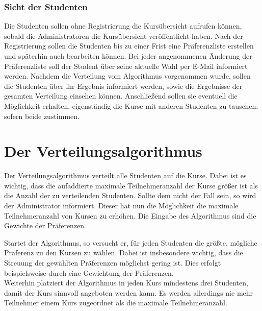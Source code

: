 		
		
			\subsubsection{Sicht der Studenten}
				Die Studenten sollen ohne Registrierung die Kursübersicht aufrufen können, sobald die Administratoren die Kursübersicht veröffentlicht haben.
				Nach der Registrierung sollen die Studenten bis zu einer Frist eine Präferenzliste erstellen und späterhin auch bearbeiten können.
				Bei jeder angenommenen Änderung der Präferenzliste soll der Student über seine aktuelle Wahl per E-Mail informiert werden.
				Nachdem die Verteilung vom Algorithmus vorgenommen wurde, sollen die Studenten über ihr Ergebnis informiert werden, sowie die Ergebnisse der gesamten Verteilung einsehen können.
				Anschließend sollen sie eventuell die Möglichkeit erhalten, eigenständig die Kurse mit anderen Studenten zu tauschen, sofern beide zustimmen.
				
				
	
	
	
	\section{Der Verteilungsalgorithmus}
		Der Verteilungsalgorithmus verteilt alle Studenten auf die Kurse.
		Dabei ist es wichtig, dass die aufaddierte maximale Teilnehmeranzahl der Kurse größer ist als die Anzahl der zu verteilenden Studenten.
		Sollte dem nicht der Fall sein, so wird der Administrator informiert.
		Dieser hat nun die Möglichkeit die maximale Teilnehmeranzahl von Kursen zu erhöhen.
		Die Eingabe des Algorithmus sind die Gewichte der Präferenzen.
		
		Startet der Algorithmus, so versucht er, für jeden Studenten die größte, mögliche Präferenz zu den Kursen zu wählen.
		Dabei ist insbesondere wichtig, dass die Streuung der gewählten Präferenzen möglichst gering ist.
		Dies erfolgt beispielsweise durch eine Gewichtung der Präferenzen.\\
		Weiterhin platziert der Algorithmus in jeden Kurs mindestens drei Studenten, damit der Kurs sinnvoll angeboten werden kann.
		Es werden allerdings nie mehr Teilnehmer einem Kurs zugeordnet als die maximale Teilnehmeranzahl.
		
